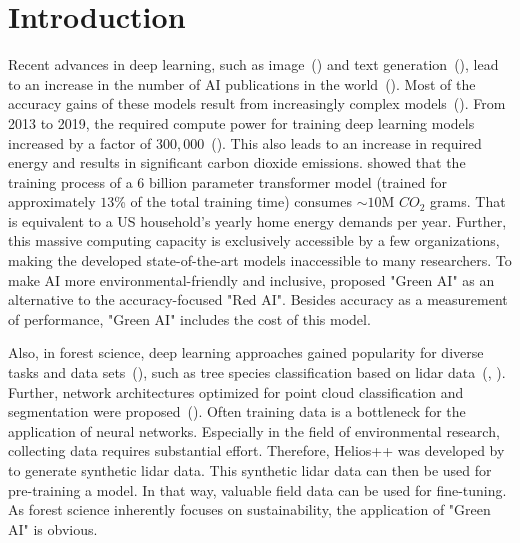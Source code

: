 \documentclass[12pt, a4paper, hidelinks]{article}
\begin{document}
\thispagestyle{plain}
\newpage


\setcounter{page}{1}
\pagestyle{fancy}


\section{Introduction}

Recent advances in deep learning, such as image~(\cite{rombach_2022_high-resolution-image-synthesis-with-latent-diffusion-models}) and text generation~(\cite{openai_2023_gpt4-4-technical-report}), lead to an increase in the number of \ac{AI} publications in the world~(\cite{zhang_2022_ai-report}).
Most of the accuracy gains of these models result from increasingly complex models~(\cite{schwartz_2019_greenai}). From 2013 to 2019, the required compute power for training deep learning models increased by a factor of $300,000$~(\cite{amodei_2018_ai-and-compute}). This also leads to an increase in required energy and results in significant carbon dioxide emissions. \cite{20220610_dodge_measuring-the-carbon-intensity-of-ai-in-cloud-instances} showed that the training process of a 6 billion parameter transformer model (trained for approximately $13$\% of the total training time) consumes $\sim 10$M $CO_2$ grams. That is equivalent to a US household's yearly home energy demands per year. Further, this massive computing capacity is exclusively accessible by a few organizations, making the developed state-of-the-art models inaccessible to many researchers. To make \ac{AI} more environmental-friendly and inclusive, \textcite{schwartz_2019_greenai} proposed "Green AI" as an alternative to the accuracy-focused "Red AI". Besides accuracy as a measurement of performance, "Green AI" includes the cost of this model.

Also, in forest science, deep learning approaches gained popularity for diverse tasks and data sets~(\cite{hamedianfar_2022_deep-learning-for-forest-inventory-and-planning-a-critical-review-on-the-remote-sensing-approaches-so-far-and-prospects-for-further-applications}), such as tree species classification based on \ac{lidar} data~(\cite{liu_2021_tree-species-classification-of-lidar-data-based-on-3D-deep-learning}, \cite{seidel_2021_predicting-tree-species-from-3D-laser-scanning-point-clouds-using-deep-learning}).
Further, network architectures optimized for point cloud classification and segmentation were proposed~(\cite{2017_qi_pointnet}).
Often training data is a bottleneck for the application of neural networks. Especially in the field of environmental research, collecting data requires substantial effort. Therefore, Helios++ was developed by~\textcite{9906068} to generate synthetic \ac{lidar} data. This synthetic \ac{lidar} data can then be used for pre-training a model. In that way, valuable field data can be used for fine-tuning.
As forest science inherently focuses on sustainability, the application of "Green AI" is obvious.
\end{document}
